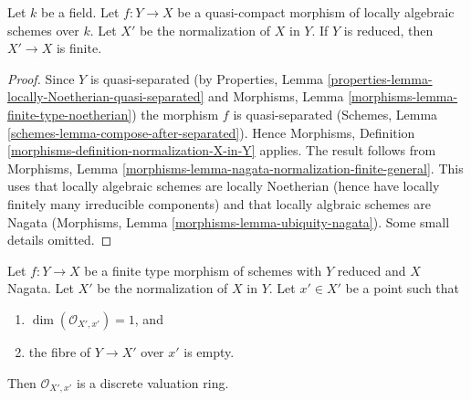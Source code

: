 \begin{lemma}
\label{lemma-relative-normalization-finite}
Let $k$ be a field. Let $f : Y \to X$ be a quasi-compact
morphism of locally algebraic schemes over $k$. Let $X'$
be the normalization of $X$ in $Y$. If $Y$ is reduced, then
$X' \to X$ is finite.
\end{lemma}

\begin{proof}
Since $Y$ is quasi-separated (by
Properties, Lemma \ref{properties-lemma-locally-Noetherian-quasi-separated} and
Morphisms, Lemma \ref{morphisms-lemma-finite-type-noetherian})
the morphism $f$ is quasi-separated
(Schemes, Lemma \ref{schemes-lemma-compose-after-separated}).
Hence Morphisms, Definition \ref{morphisms-definition-normalization-X-in-Y}
applies. The result follows from Morphisms, Lemma
\ref{morphisms-lemma-nagata-normalization-finite-general}.
This uses that locally algebraic schemes are locally Noetherian
(hence have locally finitely many irreducible components)
and that locally algbraic schemes are Nagata
(Morphisms, Lemma \ref{morphisms-lemma-ubiquity-nagata}).
Some small details omitted.
\end{proof}

\begin{lemma}
\label{lemma-relative-normalization-normal-codim-1}
Let $f : Y \to X$ be a finite type morphism of schemes with $Y$ reduced
and $X$ Nagata. Let $X'$ be the normalization of $X$ in $Y$.
Let $x' \in X'$ be a point such that
\begin{enumerate}
\item $\dim(\mathcal{O}_{X', x'}) = 1$, and
\item the fibre of $Y \to X'$ over $x'$ is empty.
\end{enumerate}
Then $\mathcal{O}_{X', x'}$ is a discrete valuation ring.
\end{lemma}

